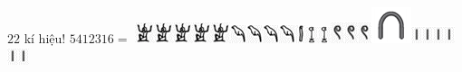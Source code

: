 $22$ kí hiệu!
	\vskip 0.1cm
	$5412316    =$ \includegraphics{7}\includegraphics{7}\includegraphics{7}\includegraphics{7}\includegraphics{7}\includegraphics{8}\includegraphics{8}\includegraphics{8}\includegraphics{8}\includegraphics{9}\includegraphics{10}\includegraphics{10}\includegraphics{11}\includegraphics{11}\includegraphics{11}\includegraphics{5}\includegraphics{12}\includegraphics{12}\includegraphics{12}\includegraphics{12}\includegraphics{12}\includegraphics{12} 
